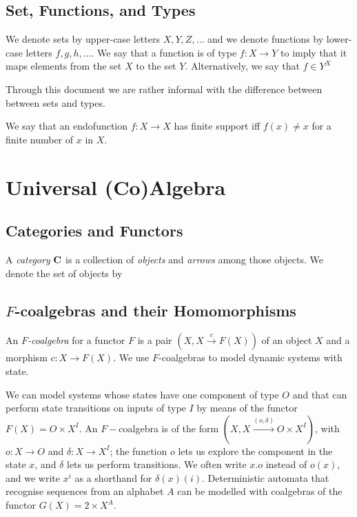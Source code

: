\subsection{Set, Functions, and Types}
We denote sets by upper-case letters $X,Y,Z,\ldots$ and we denote functions by lower-case letters $f,g,h,\ldots$. We say that a function is of type $f\colon X\rightarrow Y$ to imply that it maps elements from the set $X$ to the set $Y$. Alternatively, we say that $f\in Y^X$

Through this document we are rather informal with the difference between between sets and types.  

We say that an endofunction $f\colon X \rightarrow X$ has finite support iff $f(x)\neq x$ for a finite number of $x$ in $X$.
\section{Universal (Co)Algebra}
\label{sec:Preliminaries:Coalgebras}
\subsection{Categories and Functors}
A \emph{category} $\AsCategory{C}$ is a collection of \emph{objects} and \emph{arrows} among those objects. We denote the set of objects by
\subsection{$F$-coalgebras and their Homomorphisms}
An \emph{$F$-coalgebra} for a functor $F$ is a pair $(X,X\xrightarrow{c}F(X))$ of an object $X$ and a morphism $c\colon X\rightarrow F(X)$. We use $F$-coalgebras to model dynamic systems with state. 
\begin{example}
We can model systems whose states have one component of type $O$ and that can perform state transitions on inputs of type $I$ by means of the functor $F(X)=O\times X^I$. An $F-$coalgebra is of the form $(X,X\xrightarrow{(o,\delta)}O\times X^I)$, with $o\colon X\rightarrow O$ and $\delta\colon X\rightarrow X^I$; the function $o$ lets us explore the component in the state $x$, and $\delta$ lets us perform transitions. We often write $x.o$ instead of $o(x)$, and we write $x^i$ as a shorthand for $\delta(x)(i)$. Deterministic automata that recognise sequences from an alphabet $A$ can be modelled with coalgebras of the functor $G(X)=2\times X^A$.
\end{example}
